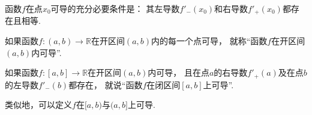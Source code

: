 \begin{theorem}[导数存在的充分必要条件]\label{theorem:导数.函数在一点的可导性及其单侧可导性的关系}
函数\(f\)在点\(x_0\)可导的充分必要条件是：
其左导数\(f'_-(x_0)\)和右导数\(f'_+(x_0)\)都存在且相等.
\end{theorem}

\begin{definition}\label{definition:导数.函数在开区间内可导}
如果函数\(f\colon(a,b)\to\mathbb{R}\)在开区间\((a,b)\)内的每一个点可导，
就称“函数\(f\)在开区间\((a,b)\)内可导”.
\end{definition}

\begin{definition}\label{definition:导数.函数在闭区间上可导}
如果函数\(f\colon[a,b]\to\mathbb{R}\)在开区间\((a,b)\)内可导，
且在点\(a\)的右导数\(f'_+(a)\)及在点\(b\)的左导数\(f'_-(b)\)都存在，
就说“函数\(f\)在闭区间\([a,b]\)上可导”.
\end{definition}

类似地，可以定义\(f\)在\([a,b)\)与\((a,b]\)上可导.

